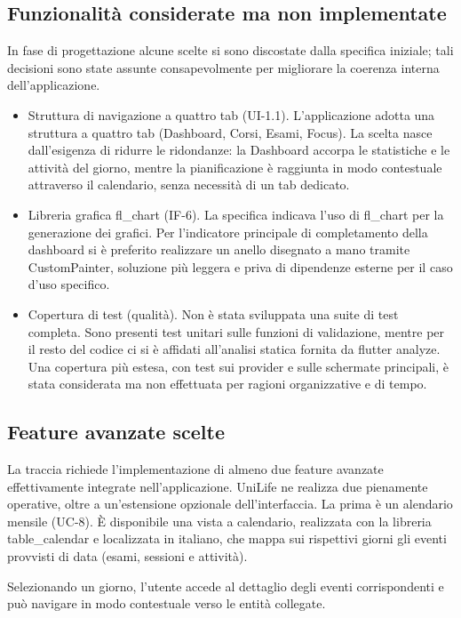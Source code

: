 \documentclass[a4paper, 12pt]{article}
\begin{document}
\subsection{Funzionalità considerate ma non implementate}
In fase di progettazione alcune scelte si sono discostate dalla specifica iniziale; tali decisioni sono state assunte consapevolmente per migliorare la coerenza interna dell'applicazione.
\begin{itemize}
    \item Struttura di navigazione a quattro tab (UI-1.1). L'applicazione adotta una struttura a quattro tab (Dashboard, Corsi, Esami, Focus). La scelta nasce dall'esigenza di ridurre le ridondanze: la Dashboard accorpa le statistiche e le attività del giorno, mentre la pianificazione è raggiunta in modo contestuale attraverso il calendario, senza necessità di un tab dedicato.
    \item Libreria grafica fl\_chart (IF-6). La specifica indicava l'uso di fl\_chart per la generazione dei grafici. Per l'indicatore principale di completamento della dashboard si è preferito realizzare un anello disegnato a mano tramite CustomPainter, soluzione più leggera e priva di dipendenze esterne per il caso d'uso specifico.
    \item Copertura di test (qualità). Non è stata sviluppata una suite di test completa. Sono presenti test unitari sulle funzioni di validazione, mentre per il resto del codice ci si è affidati all'analisi statica fornita da flutter analyze. Una copertura più estesa, con test sui provider e sulle schermate principali, è stata considerata ma non effettuata per ragioni organizzative e di tempo.
\end{itemize}
\subsection{Feature avanzate scelte}
La traccia richiede l'implementazione di almeno due feature avanzate effettivamente integrate nell'applicazione. UniLife ne realizza due pienamente operative, oltre a un'estensione opzionale dell'interfaccia.
La prima è un alendario mensile (UC-8). È disponibile una vista a calendario, realizzata con la libreria table\_calendar e localizzata in italiano, che mappa sui rispettivi giorni gli eventi provvisti di data (esami, sessioni e attività).

Selezionando un giorno, l'utente accede al dettaglio degli eventi corrispondenti e può navigare in modo contestuale verso le entità collegate.
\end{document}

